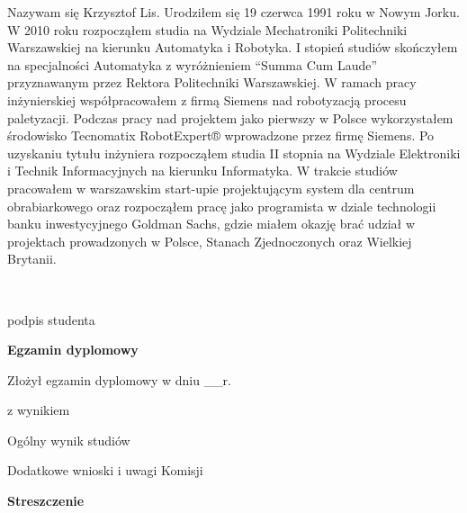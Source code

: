 \begin{titlepage}
\indent
Nazywam się Krzysztof Lis. Urodziłem się 19 czerwca 1991 roku w Nowym Jorku. W 2010 roku rozpocząłem studia na Wydziale Mechatroniki Politechniki Warszawskiej na kierunku Automatyka i Robotyka. I stopień studiów skończyłem na specjalności Automatyka z wyróżnieniem ``Summa Cum Laude'' przyznawanym przez Rektora Politechniki Warszawskiej. W ramach pracy inżynierskiej współpracowałem z firmą Siemens nad robotyzacją procesu paletyzacji. Podczas pracy nad projektem jako pierwszy w Polsce wykorzystałem środowisko Tecnomatix RobotExpert® wprowadzone przez firmę Siemens. Po uzyskaniu tytułu inżyniera rozpocząłem studia II stopnia na Wydziale Elektroniki i Technik Informacyjnych na kierunku Informatyka. W trakcie studiów pracowałem w warszawskim start-upie projektującym system dla centrum obrabiarkowego oraz rozpocząłem pracę jako programista w dziale technologii banku inwestycyjnego Goldman Sachs, gdzie miałem okazję brać udział w projektach prowadzonych w Polsce, Stanach Zjednoczonych oraz Wielkiej Brytanii.
\par
\vspace{2\baselineskip}
\hfill\parbox{15em}{{\small\dotfill}\\[-.3ex]
\centerline{\footnotesize podpis studenta}}\par
\vspace{3\baselineskip}
\begin{center}
	{\large\bfseries Egzamin dyplomowy} \par\bigskip\bigskip
\end{center}
\par\noindent\vspace{1.5\baselineskip}
Złożył egzamin dyplomowy w dniu \_\_r.
\par\noindent\vspace{1.5\baselineskip}
z wynikiem \dotfill
\par\noindent\vspace{1.5\baselineskip}
Ogólny wynik studiów \dotfill
\par\noindent\vspace{1.5\baselineskip}
Dodatkowe wnioski i uwagi Komisji \dotfill
\par\noindent\vspace{1.5\baselineskip}
\dotfill



\newpage\thispagestyle{empty}
\vspace*{2\baselineskip} 
\begin{center}
	{\large\bfseries Streszczenie}\par\bigskip
\end{center}


\end{titlepage}

